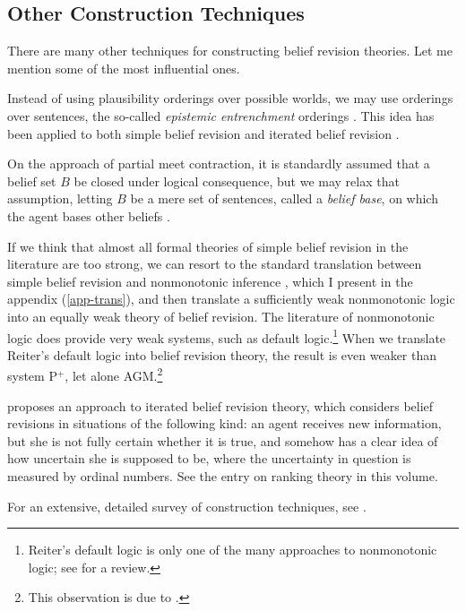\subsection{Other Construction Techniques}\label{sec-other}

There are many other techniques for constructing belief revision theories. Let me mention some of the most influential ones.\op

	\im Instead of using plausibility orderings over possible worlds, we may use orderings over sentences, the so-called {\em epistemic entrenchment} orderings \citep{gardenfors1988revisions}. This idea has been applied to both simple belief revision and iterated belief revision \citep{nayak1994iterated}. 

	\im On the approach of partial meet contraction, it is standardly assumed that a belief set $B$ be closed under logical consequence, but we may relax that assumption, letting $B$ be a mere set of sentences, called a {\em belief base}, on which the agent bases other beliefs \citep{hansson1994taking,hansson1999textbook}. 

	\im If we think that almost all formal theories of simple belief revision in the literature are too strong, we can resort to the standard translation between simple belief revision and nonmonotonic inference \citep*{makinson1991relations}, which I present in the appendix (\autoref{app-trans}), and then translate a sufficiently weak nonmonotonic logic into an equally weak theory of belief revision. The literature of nonmonotonic logic does provide very weak systems, such as  default logic.\footnote
		{
		Reiter's default logic is only one of the many approaches to nonmonotonic logic; see \citet*{brewka2008nonmonotonic} for a review.
		}
	When we translate Reiter's default logic into belief revision theory, the result is even weaker than system P$^+$, let alone AGM.\footnote
		{
		This observation is due to \citet{makinson1988general}.
		}

	\im \citet{spohn1988ordinal} proposes an approach to iterated belief revision theory, which considers belief revisions in situations of the following kind: an agent receives new information, but she is not fully certain whether it is true, and somehow has a clear idea of how uncertain she is supposed to be, where the uncertainty in question is measured by ordinal numbers. See the entry on ranking theory in this volume.

\ed For an extensive, detailed survey of construction techniques, see \citet*{rodrigues2011belief}.



